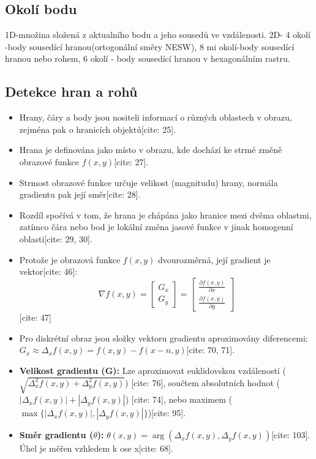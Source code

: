  \subsection{Okolí bodu}
 1D-množina složená z aktualního bodu a jeho sousedů ve vzdálenosti. 2D- 4 okolí -body sousedící hranou(ortogonální směry NESW), 8 mi okolí-body sousedící hranou nebo rohem,
 6 okolí - body sousedící hranou v hexagonálním rastru.

 \subsection{Detekce hran a rohů}
\begin{itemize}
    \item Hrany, čáry a body jsou nositeli informací o různých oblastech v obrazu, zejména pak o hranicích objektů[cite: 25].
    \item Hrana je definována jako místo v obrazu, kde dochází ke strmé změně obrazové funkce $f(x,y)$[cite: 27].
    \item Strmost obrazové funkce určuje velikost (magnitudu) hrany, normála gradientu pak její směr[cite: 28].
    \item Rozdíl spočívá v tom, že hrana je chápána jako hranice mezi dvěma oblastmi, zatímco čára nebo bod je lokální změna jasové funkce v jinak homogenní oblasti[cite: 29, 30].
\end{itemize} 
\begin{itemize}
    \item Protože je obrazová funkce $f(x,y)$ dvourozměrná, její gradient je vektor[cite: 46]: 
    \begin{equation}
        \nabla f(x,y) = \begin{bmatrix} G_x \\ G_y \end{bmatrix} = \begin{bmatrix} \frac{\partial f(x,y)}{\partial x} \\ \frac{\partial f(x,y)}{\partial y} \end{bmatrix}
    \end{equation} [cite: 47]
    \item Pro diskrétní obraz jsou složky vektoru gradientu aproximovány diferencemi: $G_x \approx \Delta_x f(x,y) = f(x,y) - f(x-n, y)$[cite: 70, 71].
    \item \textbf{Velikost gradientu (G):} Lze aproximovat euklidovskou vzdáleností ($\sqrt{\Delta_x^2 f(x,y) + \Delta_y^2 f(x,y)}$) [cite: 76], součtem absolutních hodnot ($|\Delta_x f(x,y)| + |\Delta_y f(x,y)|$) [cite: 74], nebo maximem ($\max\{|\Delta_x f(x,y)|, |\Delta_y f(x,y)|\}$)[cite: 95].
    \item \textbf{Směr gradientu ($\theta$):} $\theta(x,y) = \arg(\Delta_x f(x,y), \Delta_y f(x,y))$[cite: 103]. Úhel je měřen vzhledem k ose x[cite: 68].
\end{itemize}
